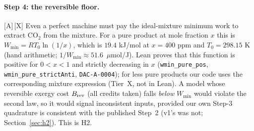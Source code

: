 \documentclass[10pt]{article}
\newcommand{\tier}[1]{\textsf{[#1]}}
\newcommand{\tA}{\tier{A}}
\newcommand{\tX}{\tier{X}}
\newcommand{\lean}[1]{\texttt{#1}}
\newcommand{\id}[1]{\texttt{DAC-#1}}
\newcommand{\umolJ}{\ensuremath{\mu}mol/J}
\begin{document}
\paragraph{Step 4: the reversible floor.}\tA{}\,\tX{} Even a perfect machine must pay the ideal-mixture minimum work to extract CO$_2$ from the mixture. For a pure product at mole fraction $x$ this is
$W_{\min}=RT_0\ln(1/x)$, which is $19.4$ kJ/mol at $x=400$ ppm and $T_0=298.15$ K (hand arithmetic; $1/W_{\min}\approx51.6$~\umolJ{}). Lean proves that this function is positive for $0<x<1$ and strictly decreasing in $x$ (\lean{wmin\_pure\_pos}, \lean{wmin\_pure\_strictAnti}, \id{A-0004}); for less pure products our code uses
the corresponding mixture expression (Tier~X, not in Lean). A model whose reversible exergy cost $B_{\rm rev}$ (all credits taken) falls \emph{below} $W_{\min}$ would violate the second law, so it would signal inconsistent inputs, provided our own Step-3 quadrature is consistent with the published Step~2 (v1's was not; Section~\ref{sec:h2}). This is H2.
\end{document}
